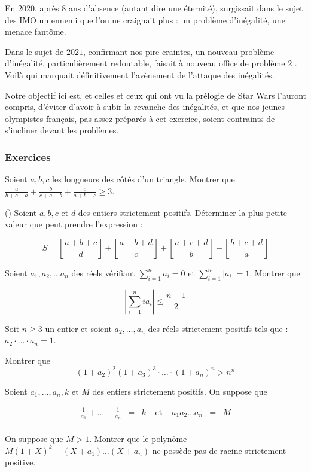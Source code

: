 
En $2020$, après $8$ ans d'absence (autant dire une éternité), surgissait dans le sujet des IMO un ennemi que l'on ne craignait plus : un problème d'inégalité, une menace fantôme.

Dans le sujet de $2021$, confirmant nos pire craintes, un nouveau problème d'inégalité, particulièrement redoutable, faisait à nouveau office de problème $2$ . Voilà qui marquait définitivement l'avènement de l'attaque des inégalités.

Notre objectif ici est, et celles et ceux qui ont vu la prélogie de Star Wars l'auront compris, d'éviter d'avoir à subir la revanche des inégalités, et que nos jeunes olympistes français, pas assez préparés à cet exercice, soient contraints de s'incliner devant les problèmes.

\subsubsection{Exercices}
\begin{exo}
Soient $a,b,c$ les longueurs des côtés d'un triangle. Montrer que $\frac{a}{b+c-a}+\frac{b}{c+a-b}+\frac{c}{a+b-c} \ge 3$.
\end{exo}

\begin{exo}[BXMO 2014]
() Soient $a,b,c$ et $d$ des entiers strictement positifs. Déterminer la plus petite valeur que peut prendre l'expression :

$$S=\left\lfloor \frac{a+b+c}{d}\right\rfloor + \left\lfloor \frac{a+b+d}{c}\right\rfloor + \left\lfloor \frac{a+c+d}{b}\right\rfloor +\left\lfloor \frac{b+c+d}{a}\right\rfloor$$
\end{exo}

\begin{exo}
Soient $a_1,a_2,\ldots a_n$ des réels vérifiant $\sum_{i=1}^{n} a_i=0$ et $\sum_{i=1}^{n} |a_i| =1$. Montrer que

$$\left| \sum_{i=1}^{n} ia_i \right| \le \frac{n-1}2$$
\end{exo}


\begin{exo}[IMO 2012 P2]
Soit $n \ge 3$ un entier et soient $a_2,\dots,a_n$ des réels strictement positifs tels que : $a_2 \cdot \dots \cdot a_n =1$.

Montrer que
$$(1+a_2)^2(1+a_3)^3 \cdot \dots \cdot (1+a_n)^n > n^n$$
\end{exo}

\begin{exo}[IMO SL 2017 A1]
Soient $a_1, \dots, a_n, k$ et $M$ des entiers strictement positifs. On suppose que

$$\begin{array}{lllllll}
\frac1{a_1}+ \ldots + \frac1{a_n} &=& k &\text{ et }& a_1 a_2 \ldots a_n &=& M\\
\end{array}$$

On suppose que $M>1$. Montrer que le polynôme $M(1+X)^k-(X+a_1) \ldots (X+a_n)$ ne possède pas de racine strictement positive.
\end{exo}

